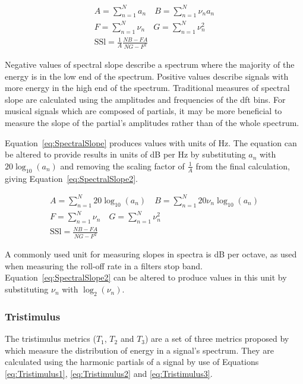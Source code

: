 			\begin{gather}
				A = \sum_{n = 1}^{N} a_{n}
				\quad 
				B = \sum_{n = 1}^{N} \nu_{n}a_{n} \nonumber \\
				F = \sum_{n = 1}^{N} \nu_{n} \quad G = \sum_{n = 1}^{N} \nu_{n}^{2} \nonumber \\
				\mathrm{SSl} = \frac{1}{A} \frac{NB - FA}{NG - F^{2}}
				\label{eq:SpectralSlope}
			\end{gather}

			Negative values of spectral slope describe a spectrum where the majority of the energy is in the
			low end of the spectrum. Positive values describe signals with more energy in the high end of the
			spectrum. Traditional measures of spectral slope are calculated using the amplitudes and
			frequencies of the \acrshort{dft} bins. For musical signals which are composed of partials, it may
			be more beneficial to measure the slope of the partial's amplitudes rather than of the whole
			spectrum. 
			
			Equation~\ref{eq:SpectralSlope} produces values with units of Hz. The equation can be
			altered to provide results in units of dB per Hz by substituting $a_{n}$ with $20\log_{10}(a_{n})$
			and removing the scaling factor of $\frac{1}{A}$ from the final calculation, giving
			Equation~\ref{eq:SpectralSlope2}.
			
			\begin{gather}
				A = \sum_{n = 1}^{N} 20\log_{10}(a_{n})
				\quad 
				B = \sum_{n = 1}^{N} 20\nu_{n}\log_{10}(a_{n}) \nonumber \\
				F = \sum_{n = 1}^{N} \nu_{n} \quad G = \sum_{n = 1}^{N} \nu_{n}^{2} \nonumber \\
				\mathrm{SSl} = \frac{NB - FA}{NG - F^{2}}
				\label{eq:SpectralSlope2}
			\end{gather}
			
			A commonly used unit for measuring slopes in spectra is dB per octave, as used when measuring the
			roll-off rate in a filters stop band. Equation~\ref{eq:SpectralSlope2} can be altered to produce
			values in this unit by substituting $\nu_{n}$ with $\log_{2}(\nu_{n})$.

		\subsubsection*{Tristimulus}
			The tristimulus metrics ($T_{1}$, $T_{2}$ and $T_{3}$) are a set of three metrics proposed by
			\citet{pollard1982a} which measure the distribution of energy in a signal's spectrum. They are
			calculated using the harmonic partials of a signal by use of Equations \ref{eq:Tristimulus1},
			\ref{eq:Tristimulus2} and \ref{eq:Tristimulus3}.
			
